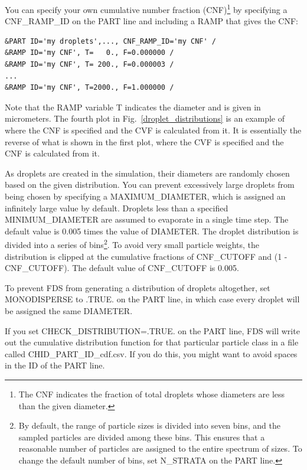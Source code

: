 \documentclass[11pt]{book}
\begin{document}
You can specify your own cumulative number fraction (CNF)\footnote{The CNF indicates the fraction of total droplets whose diameters are less than the given diameter.} by specifying a {\ct CNF\_RAMP\_ID} on the {\ct PART} line and including a {\ct RAMP} that gives the CNF:
\begin{lstlisting}
&PART ID='my droplets',..., CNF_RAMP_ID='my CNF' /
&RAMP ID='my CNF', T=   0., F=0.000000 /
&RAMP ID='my CNF', T= 200., F=0.000003 /
...
&RAMP ID='my CNF', T=2000., F=1.000000 /
\end{lstlisting}
Note that the {\ct RAMP} variable {\ct T} indicates the diameter and is given in micrometers. The fourth plot in Fig.~\ref{droplet_distributions} is an example of where the CNF is specified and the CVF is calculated from it. It is essentially the reverse of what is shown in the first plot, where the CVF is specified and the CNF is calculated from it.

As droplets are created in the simulation, their diameters are randomly chosen based on the given distribution. You can prevent excessively large droplets from being chosen by specifying a {\ct MAXIMUM\_DIAMETER}, which is assigned an infinitely large value by default. Droplets less than a specified {\ct MINIMUM\_DIAMETER} are assumed to evaporate in a single time step. The default value is 0.005 times the value of {\ct DIAMETER}. The droplet distribution is divided into a series of bins\footnote{By default, the range of particle sizes is divided into seven bins, and the sampled particles are divided among these bins. This ensures that a reasonable number of particles are assigned to the entire spectrum of sizes. To change the default number of bins, set {\ct N\_STRATA} on the {\ct PART} line.}. To avoid very small particle weights, the distribution is clipped at the cumulative fractions of {\ct CNF\_CUTOFF} and (1 - {\ct CNF\_CUTOFF}). The default value of {\ct CNF\_CUTOFF} is 0.005.

To prevent FDS from generating a distribution of droplets altogether, set {\ct MONODISPERSE} to {\ct .TRUE.} on the {\ct PART} line, in which case every droplet will be assigned the same {\ct DIAMETER}.

If you set {\ct CHECK\_DISTRIBUTION=.TRUE.} on the {\ct PART} line, FDS will write out the cumulative distribution function for that particular particle class in a file called {\ct CHID\_PART\_ID\_cdf.csv}. If you do this, you might want to avoid spaces in the {\ct ID} of the {\ct PART} line.
\end{document}
